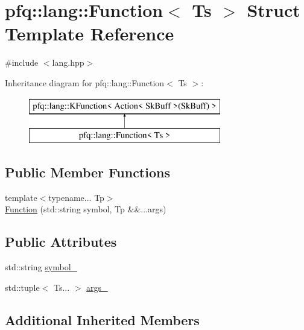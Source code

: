 \hypertarget{structpfq_1_1lang_1_1Function}{}\section{pfq\+:\+:lang\+:\+:Function$<$ Ts $>$ Struct Template Reference}
\label{structpfq_1_1lang_1_1Function}


{\ttfamily \#include $<$lang.\+hpp$>$}

Inheritance diagram for pfq\+:\+:lang\+:\+:Function$<$ Ts $>$\+:\begin{figure}[H]
\begin{center}
\leavevmode
\includegraphics[height=2.000000cm]{structpfq_1_1lang_1_1Function}
\end{center}
\end{figure}
\subsection*{Public Member Functions}
\begin{DoxyCompactItemize}
\item 
{\footnotesize template$<$typename... Tp$>$ }\\\hyperlink{structpfq_1_1lang_1_1Function_a262782ac0fc302fb2c1ce704e272a7a1}{Function} (std\+::string symbol, Tp \&\&...args)
\end{DoxyCompactItemize}
\subsection*{Public Attributes}
\begin{DoxyCompactItemize}
\item 
std\+::string \hyperlink{structpfq_1_1lang_1_1Function_a603c829dffbee5b0cd1900672cf68492}{symbol\+\_\+}
\item 
std\+::tuple$<$ Ts... $>$ \hyperlink{structpfq_1_1lang_1_1Function_a1451f8a19d96e0d3e2885f3b7278c8d3}{args\+\_\+}
\end{DoxyCompactItemize}
\subsection*{Additional Inherited Members}


